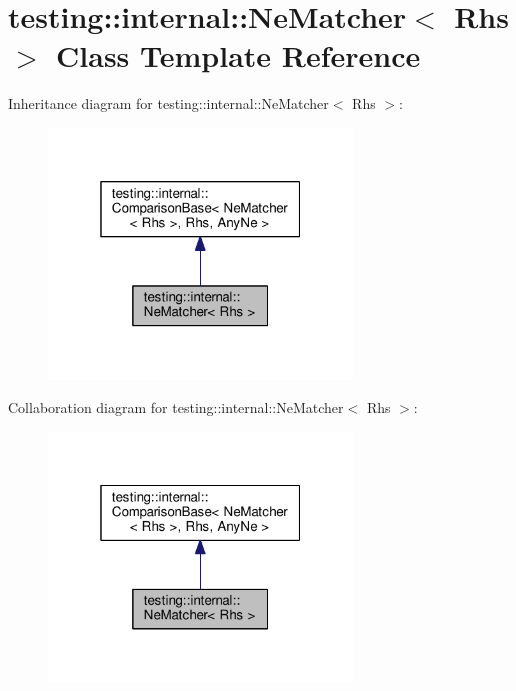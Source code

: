\hypertarget{classtesting_1_1internal_1_1NeMatcher}{}\section{testing\+:\+:internal\+:\+:Ne\+Matcher$<$ Rhs $>$ Class Template Reference}
\label{classtesting_1_1internal_1_1NeMatcher}


Inheritance diagram for testing\+:\+:internal\+:\+:Ne\+Matcher$<$ Rhs $>$\+:\nopagebreak
\begin{figure}[H]
\begin{center}
\leavevmode
\includegraphics[width=229pt]{classtesting_1_1internal_1_1NeMatcher__inherit__graph}
\end{center}
\end{figure}


Collaboration diagram for testing\+:\+:internal\+:\+:Ne\+Matcher$<$ Rhs $>$\+:\nopagebreak
\begin{figure}[H]
\begin{center}
\leavevmode
\includegraphics[width=229pt]{classtesting_1_1internal_1_1NeMatcher__coll__graph}
\end{center}
\end{figure}

